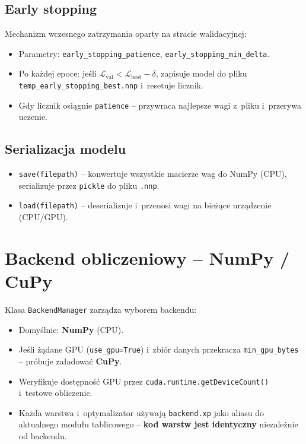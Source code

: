 \documentclass[12pt,a4paper]{article}
\begin{document}
\subsection{Early stopping}

Mechanizm wczesnego zatrzymania oparty na stracie walidacyjnej:
\begin{itemize}
  \item Parametry: \texttt{early\_stopping\_patience}, \texttt{early\_stopping\_min\_delta}.
  \item Po każdej epoce: jeśli $\mathcal{L}_{\text{val}} < \mathcal{L}_{\text{best}} - \delta$, zapisuje model do pliku \texttt{temp\_early\_stopping\_best.nnp} i~resetuje licznik.
  \item Gdy licznik osiągnie \texttt{patience} -- przywraca najlepsze wagi z~pliku i~przerywa uczenie.
\end{itemize}

\subsection{Serializacja modelu}

\begin{itemize}
  \item \texttt{save(filepath)} -- konwertuje wszystkie macierze wag do NumPy (CPU), serializuje przez \texttt{pickle} do pliku \texttt{.nnp}.
  \item \texttt{load(filepath)} -- deserializuje i~przenosi wagi na bieżące urządzenie (CPU/GPU).
\end{itemize}

\section{Backend obliczeniowy -- NumPy / CuPy}

Klasa \texttt{BackendManager} zarządza wyborem backendu:
\begin{itemize}
  \item Domyślnie: \textbf{NumPy} (CPU).
  \item Jeśli żądane GPU (\texttt{use\_gpu=True}) i~zbiór danych przekracza \texttt{min\_gpu\_bytes} -- próbuje załadować \textbf{CuPy}.
  \item Weryfikuje dostępność GPU przez \texttt{cuda.runtime.getDeviceCount()} i~testowe obliczenie.
  \item Każda warstwa i~optymalizator używają \texttt{backend.xp} jako aliasu do aktualnego modułu tablicowego -- \textbf{kod warstw jest identyczny} niezależnie od backendu.
\end{itemize}
\end{document}
